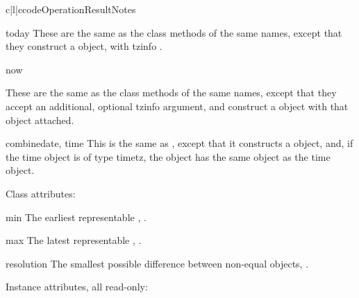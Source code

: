\begin{tableiii}{c|l|c}{code}{Operation}{Result}{Notes}
\begin{funcdesc}{today}{}
    These are the same as the  class methods of the
    same names, except that they construct a 
    object, with tzinfo .
\end{funcdesc}

\begin{funcdesc}{now}{}

    These are the same as the  class methods of the same names,
    except that they accept an additional, optional tzinfo argument, and
    construct a  object with that  object attached.
\end{funcdesc}

\begin{funcdesc}{combine}{date, time}
    This is the same as , except that it constructs
    a  object, and, if the time object is of type timetz,
    the  object has the same  object as the time object.
\end{funcdesc}

Class attributes:

\begin{memberdesc}{min}
        The earliest representable ,
        .
\end{memberdesc}

\begin{memberdesc}{max}
        The latest representable ,
        .
\end{memberdesc}

\begin{memberdesc}{resolution}
        The smallest possible difference between non-equal 
        objects, .
\end{memberdesc}

Instance attributes, all read-only:


\end{tableiii}
